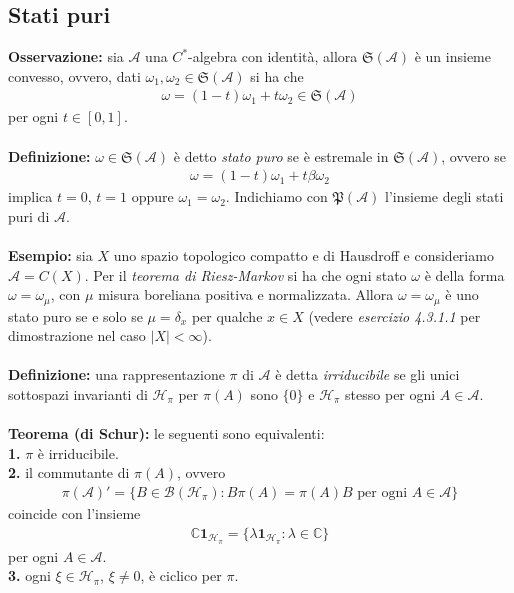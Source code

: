 \documentclass{article}
\numberwithin{equation}{subsection}
\begin{document}
\newpage
\subsection{Stati puri}
\textbf{Osservazione:} sia $\mathscr{A}$ una $C^*$-algebra con identità, allora $\mathfrak{S}(\mathscr{A})$ è un insieme convesso, ovvero, dati $\omega_1, \omega_2 \in \mathfrak{S}(\mathscr{A})$ si ha che
\begin{align*}
    \omega = (1 - t)\omega_1 + t\omega_2 \in \mathfrak{S}(\mathscr{A})
\end{align*}
per ogni $t \in [0, 1]$. \\ \\
\textbf{Definizione:} $\omega \in \mathfrak{S}(\mathscr{A})$ è detto \textit{stato puro} se è estremale in $\mathfrak{S}(\mathscr{A})$, ovvero se 
\begin{align*}
    \omega = (1 - t)\omega_1 + t\beta\omega_2
\end{align*}
implica $t = 0$, $t = 1$ oppure $\omega_1 = \omega_2$. Indichiamo con $\mathfrak{P}(\mathscr{A})$ l'insieme degli stati puri di $\mathscr{A}$. \\ \\
\textbf{Esempio:} sia $X$ uno spazio topologico compatto e di Hausdroff e consideriamo $\mathscr{A} = C(X)$. Per il \textit{teorema di Riesz-Markov} si ha che ogni stato $\omega$ è della forma $\omega = \omega_\mu$, con $\mu$ misura boreliana positiva e normalizzata. Allora $\omega = \omega_\mu$ è uno stato puro se e solo se $\mu = \delta_x$ per qualche $x \in X$ (vedere \textit{esercizio 4.3.1.1} per dimostrazione nel caso $|X| <\infty$). \\ \\
\textbf{Definizione:} una rappresentazione $\pi$ di $\mathscr{A}$ è detta \textit{irriducibile} se gli unici sottospazi invarianti di $\mathcal{H}_\pi$ per $\pi(A)$ sono $\{0\}$ e $\mathcal{H}_\pi$ stesso per ogni $A \in \mathscr{A}$. \\ \\
\textbf{Teorema (di Schur):} le seguenti sono equivalenti: \\
\textbf{1.} $\pi$ è irriducibile. \\
\textbf{2.} il commutante di $\pi(A)$, ovvero
\begin{align*}
    \pi(\mathscr{A})' = \{B \in \mathcal{B}(\mathcal{H}_\pi) : B\pi(A) = \pi(A)B \text{ per ogni } A \in \mathscr{A}\}
\end{align*}
coincide con l'insieme
\begin{align*}
    \mathbb{C}\mathbf{1}_{\mathcal{H}_\pi} = \{\lambda\mathbf{1}_{\mathcal{H}_\pi} : \lambda \in \mathbb{C}\}
\end{align*}
per ogni $A \in \mathscr{A}$. \\
\textbf{3.} ogni $\xi \in \mathcal{H}_\pi$, $\xi \neq 0$, è ciclico per $\pi$. \\
\end{document}
